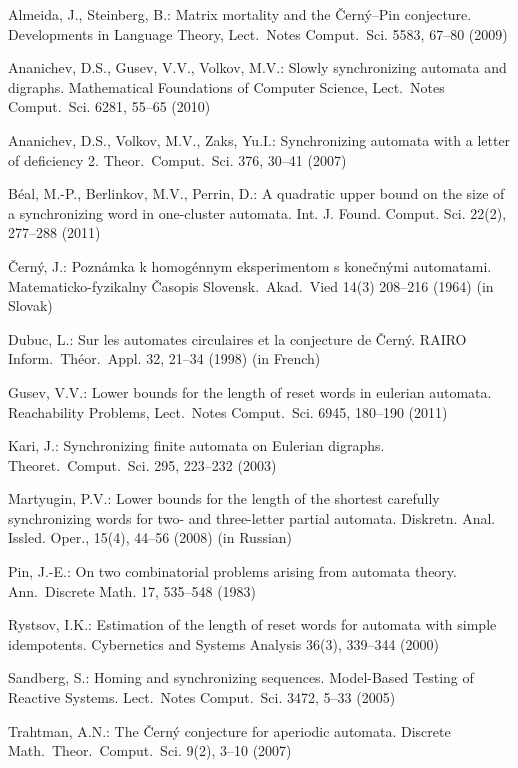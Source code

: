 \documentclass[11pt]{llncs}
\begin{document}
\begin{thebibliography}{99}
Almeida, J., Steinberg, B.: Matrix mortality and the \v{C}ern\'{y}--Pin conjecture. Developments in Language Theory, Lect.\ Notes Comput.\
Sci. 5583, 67--80 (2009)

Ananichev, D.S., Gusev, V.V., Volkov, M.V.: Slowly synchronizing automata and
digraphs. Mathematical Foundations of Computer Science, Lect.\ Notes Comput.\ Sci. 6281, 55--65 (2010)

Ananichev, D.S., Volkov, M.V., Zaks, Yu.I.: Synchronizing automata
with a letter of deficiency 2. Theor.\ Comput.\ Sci. 376, 30--41 (2007)

B\'{e}al, M.-P., Berlinkov, M.V., Perrin, D.: A quadratic upper bound on the size of a synchronizing word
in one-cluster automata. Int. J. Found. Comput. Sci. 22(2), 277--288 (2011)

\v{C}ern\'{y}, J.: Pozn\'{a}mka k homog\'{e}nnym eksperimentom s
kone\v{c}n\'{y}mi automatami. Matematicko-fyzikalny \v{C}asopis
Slovensk.\ Akad.\ Vied 14(3) 208--216 (1964) (in Slovak)

Dubuc, L.: Sur les automates circulaires et la conjecture de
\v{C}ern\'y. RAIRO Inform.\ Th\'eor.\ Appl. 32, 21--34 (1998) (in
French)

Gusev, V.V.: Lower bounds for the length of reset words in eulerian automata.
Reachability Problems, Lect.\ Notes Comput.\ Sci. 6945, 180--190 (2011)

Kari, J.: Synchronizing finite automata on Eulerian digraphs.
Theoret.\ Comput.\ Sci. 295, 223--232 (2003)

Martyugin, P.V.: Lower bounds for the length of the shortest carefully synchronizing
words for two- and three-letter partial automata. Diskretn. Anal. Issled. Oper., 15(4), 44--56 (2008)
(in Russian)

Pin, J.-E.: On two combinatorial problems arising from automata
theory. Ann.\ Discrete Math. 17, 535--548 (1983)

Rystsov, I.K.: Estimation of the length of reset words for automata with simple idempotents.
Cybernetics and Systems Analysis 36(3), 339--344 (2000)

Sandberg, S.: Homing and synchronizing sequences. Model-Based Testing of Reactive Systems. Lect.\ Notes Comput.\ Sci. 3472, 5--33 (2005)

Trahtman, A.N.: The \v{C}ern\'y conjecture for aperiodic automata.
Discrete Math.\ Theor.\ Comput.\ Sci. 9(2), 3--10 (2007)


\end{thebibliography}
\end{document}
